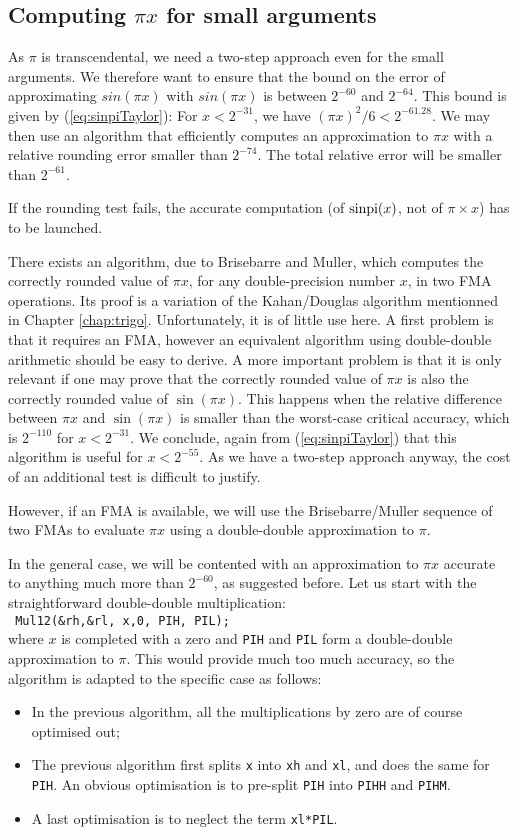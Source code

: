 \subsection{Computing $\pi x$ for small arguments}
As $\pi$ is transcendental, we need a two-step approach even for the
small arguments.  We therefore want to ensure that the bound on the
error of approximating $sin(\pi x)$ with $sin(\pi x)$ is between
$2^{-60}$ and $2^{-64}$.  This bound is given by
(\ref{eq:sinpiTaylor}): For $x<2^{-31}$, we have $(\pi x)^2/6
<2^{-61.28}$.  We may then use an algorithm that efficiently computes
an approximation to $\pi x$ with a relative rounding error smaller
than $2^{-74}$. The total relative error will be smaller than
$2^{-61}$.

If the rounding test fails, the accurate computation (of $\operatorname{sinpi}(x)$,
not of $\pi\times x$) has to be launched.

There exists an algorithm, due to Brisebarre and Muller, which
computes the correctly rounded value of $\pi x$, for any
double-precision number $x$, in two FMA operations.  Its proof is a
variation of the Kahan/Douglas algorithm mentionned in Chapter
\ref{chap:trigo}. Unfortunately, it is of little use here. A first
problem is that it requires an FMA, however an equivalent algorithm
using double-double arithmetic should be easy to derive. A more
important problem is that it is only relevant if one may prove that
the correctly rounded value of $\pi x$ is also the correctly rounded
value of $\sin(\pi x)$. This happens when the relative difference
between $\pi x$ and $\sin(\pi x)$ is smaller than the worst-case
critical accuracy, which is $2^{-110}$ for
$x<2^{-31}$. We conclude, again from (\ref{eq:sinpiTaylor}) that this
algorithm is useful for $x<2^{-55}$.
As we have a two-step approach anyway, the cost of an additional test
is difficult to justify.

However, if an FMA is available, we will use the Brisebarre/Muller sequence of two
FMAs to evaluate $\pi x$ using  a double-double
approximation to $\pi$.

In the general case, we will be contented with an approximation to
$\pi x$ accurate to anything much more than $2^{-60}$, as suggested
before. Let us start with the straightforward double-double multiplication:\\
\texttt{ Mul12(\&rh,\&rl, x,0, PIH, PIL);}\\
where $x$ is completed with a zero and \texttt{PIH} and \texttt{PIL}
form a double-double approximation to $\pi$. This would provide much
too much accuracy, so the algorithm is adapted to the specific case as
follows:
\begin{itemize}
\item In the previous algorithm, all the multiplications by zero are of course optimised out;
\item The previous algorithm first splits \texttt{x} into \texttt{xh}
  and \texttt{xl}, and does the same for \texttt{PIH}. An obvious
  optimisation is to pre-split \texttt{PIH} into \texttt{PIHH} and
  \texttt{PIHM}.
\item A last optimisation is to neglect the term \texttt{xl*PIL}.
\end{itemize}

